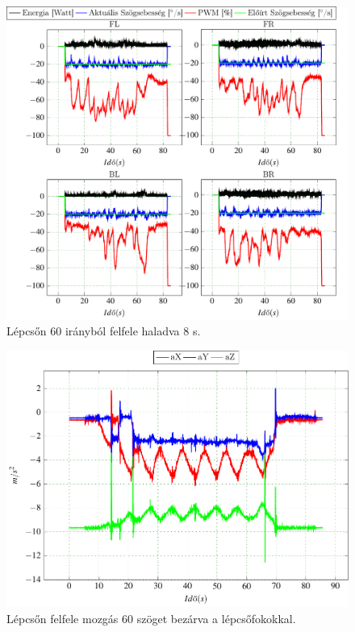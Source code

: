 \begin{figure}[H]
  \includegraphics{tikz/LepcsoAulaSlegenFelx.pdf}
  \caption{Lépcsőn 60 \degree irányból felfele haladva 8 s.}
  \label{fig:LepcsoAulaSlegenFelx}
\end{figure}

\begin{figure}[H]
  \begin{center}
  	\includegraphics[scale=0.8]{tikz/ImuLepcsoAulaSlegenFel1.pdf}
  \end{center}
  \caption{Lépcsőn felfele mozgás 60 \degree szöget bezárva a lépcsőfokokkal.}
  \label{fig:ImuLepcsoAulaSlegenFel1}
\end{figure}















